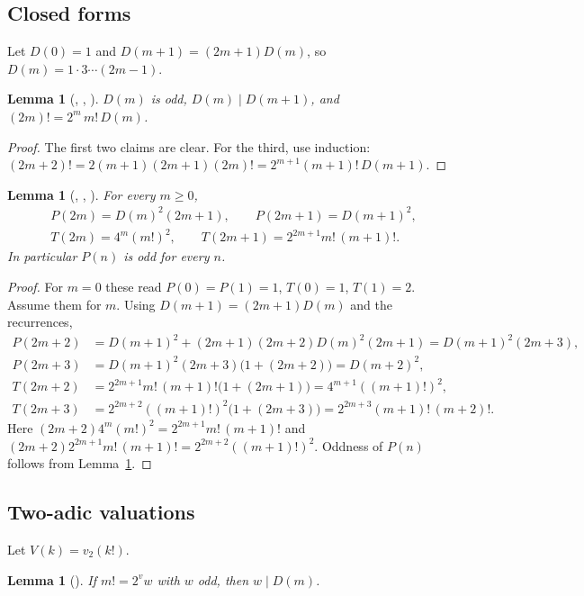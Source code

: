\documentclass[11pt]{amsart}
\theoremstyle{plain}
\newtheorem{lemma}[theorem]{Lemma}
\theoremstyle{definition}
\begin{document}
\subsection{Closed forms}
Let $D(0)=1$ and $D(m+1)=(2m+1)D(m)$, so $D(m)=1\cdot3\cdots(2m-1)$.

\begin{lemma}[, , ]\label{lem:D}
$D(m)$ is odd, $D(m)\mid D(m+1)$, and $(2m)!=2^m\,m!\,D(m)$.
\end{lemma}

\begin{proof}
The first two claims are clear. For the third, use induction: $(2m+2)!=2(m+1)(2m+1)(2m)!=2^{m+1}(m+1)!\,D(m+1)$.
\end{proof}

\begin{lemma}[, , ]\label{lem:closed}
For every $m\ge0$,
\begin{gather*}
  P(2m)=D(m)^2(2m+1),\qquad P(2m+1)=D(m+1)^2,\\
  T(2m)=4^m(m!)^2,\qquad T(2m+1)=2^{2m+1}m!\,(m+1)!.
\end{gather*}
In particular $P(n)$ is odd for every $n$.
\end{lemma}

\begin{proof}
For $m=0$ these read $P(0)=P(1)=1$, $T(0)=1$, $T(1)=2$. Assume them for $m$. Using $D(m+1)=(2m+1)D(m)$ and the recurrences,
\begin{align*}
  P(2m+2)&=D(m+1)^2+(2m+1)(2m+2)D(m)^2(2m+1)=D(m+1)^2(2m+3),\\
  P(2m+3)&=D(m+1)^2(2m+3)\bigl(1+(2m+2)\bigr)=D(m+2)^2,\\
  T(2m+2)&=2^{2m+1}m!\,(m+1)!\bigl(1+(2m+1)\bigr)=4^{m+1}((m+1)!)^2,\\
  T(2m+3)&=2^{2m+2}((m+1)!)^2\bigl(1+(2m+3)\bigr)=2^{2m+3}(m+1)!\,(m+2)!.
\end{align*}
Here $(2m+2)4^m(m!)^2=2^{2m+1}m!\,(m+1)!$ and $(2m+2)2^{2m+1}m!\,(m+1)!=2^{2m+2}((m+1)!)^2$. Oddness of $P(n)$ follows from Lemma~\ref{lem:D}.
\end{proof}

\subsection{Two-adic valuations}
Let $V(k)=v_2(k!)$.

\begin{lemma}[]\label{lem:oddpart}
If $m!=2^v w$ with $w$ odd, then $w\mid D(m)$.
\end{lemma}
\end{document}
